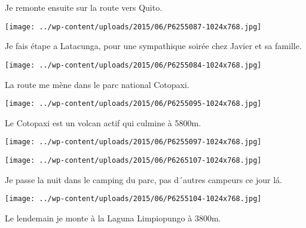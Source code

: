  

 Je remonte ensuite sur la route vers Quito. 

 

\begin{center} \texttt{[image: ../wp-content/uploads/2015/06/P6255087-1024x768.jpg]} \end{center}

 

 Je fais étape a Latacunga, pour une sympathique soirée chez Javier et sa famille. 

 

\begin{center} \texttt{[image: ../wp-content/uploads/2015/06/P6255084-1024x768.jpg]} \end{center}

 

 La route me mène dans le parc national Cotopaxi. 

 

\begin{center} \texttt{[image: ../wp-content/uploads/2015/06/P6255095-1024x768.jpg]} \end{center}

 

 Le Cotopaxi est un volcan actif qui culmine à 5800m. 

 

\begin{center} \texttt{[image: ../wp-content/uploads/2015/06/P6255097-1024x768.jpg]} \end{center}

 

 

\begin{center} \texttt{[image: ../wp-content/uploads/2015/06/P6265107-1024x768.jpg]} \end{center}

 

 Je passe la nuit dans le camping du parc, pas d´autres campeurs ce jour lá. 

 

\begin{center} \texttt{[image: ../wp-content/uploads/2015/06/P6255104-1024x768.jpg]} \end{center}

 

 Le lendemain je monte à la Laguna Limpiopungo à 3800m. 

 

